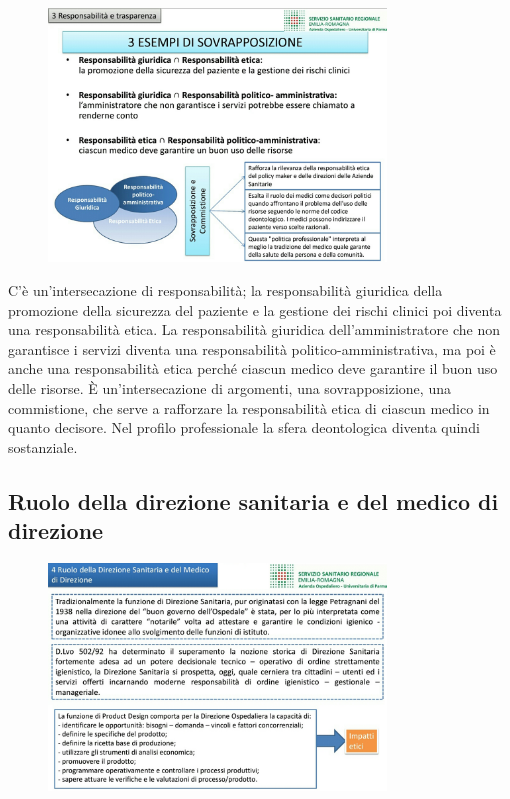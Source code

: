  \begin{figure}[!ht]
\centering
	\includegraphics[width=0.8\textwidth]{32/image17.jpeg}
	\end{figure}

C'è un'intersecazione di responsabilità; la responsabilità giuridica
della promozione della sicurezza del paziente e la gestione dei rischi
clinici poi diventa una responsabilità etica. La responsabilità
giuridica dell'amministratore che non garantisce i servizi diventa una
responsabilità politico-amministrativa, ma poi è anche una
responsabilità etica perché ciascun medico deve garantire il buon uso
delle risorse. È un'intersecazione di argomenti, una sovrapposizione,
una commistione, che serve a rafforzare la responsabilità etica di
ciascun medico in quanto decisore. Nel profilo professionale la sfera
deontologica diventa quindi sostanziale.

\subsection{Ruolo della direzione sanitaria e del medico di direzione}

 \begin{figure}[!ht]
\centering
	\includegraphics[width=0.8\textwidth]{32/image18.jpeg}
	\end{figure}

